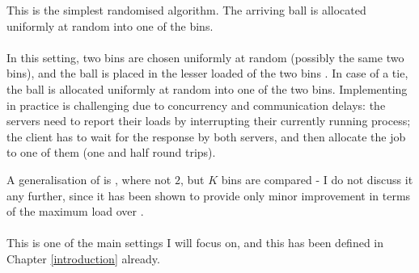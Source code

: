 This is the simplest randomised algorithm. The arriving ball is allocated uniformly at random into one of the bins.

\paragraph{\TwoChoice}
In this setting, two bins are chosen uniformly at random (possibly the same two bins), and the ball is placed in the lesser loaded of the two bins . In case of a tie, the ball is allocated uniformly at random into one of the two bins. Implementing \TwoChoice in practice is challenging due to concurrency and communication delays: the servers need to report their loads by interrupting their currently running process; the client has to wait for the response by both servers, and then allocate the job to one of them (one and half round trips).

A generalisation of \TwoChoice is \KChoice, where not $2$, but $K$ bins are compared - I do not discuss it any further, since it has been shown to provide only minor improvement in terms of the maximum load over \TwoChoice \cite{azar1999twochoice}.


\paragraph{\TwoThinning}

This is one of the main settings I will focus on, and this has been defined in Chapter \ref{introduction} already.

